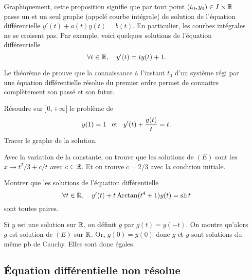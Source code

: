 \documentclass{magnolia}
\begin{document}
\begin{remarques}
\remarque Graphiquement, cette proposition signifie que par tout
  point $(t_0,y_0)\in I\times \mathbb{R}$ passe un et un seul graphe (appelé courbe
  intégrale) de solution de l'équation différentielle $y'(t)+a(t) y(t)=b(t)$. En
  particulier, les courbes intégrales ne se croisent pas. Par exemple, voici quelques
  solutions de l'équation différentielle
  \[\forall t\in\mathbb{R},\quad y'(t)=ty(t)+1.\]
\begin{center}
\end{center}
\remarque Le théorème de  prouve que la connaissance à l'instant $t_0$ d'un système régi par une équation différentielle résolue du premier ordre permet de connaitre complètement son passé et son futur.
\end{remarques}

\begin{exos}
\exo Résoudre sur $]0,+\infty[$ le problème de 
  \[y(1)=1 \quad\!\text{et}\quad\! y'(t)+\frac{y(t)}{t}=t.\]
Tracer le graphe de la solution.
\begin{sol}
Avec la variation de la constante, on trouve que les solutions de $(E)$ sont les $x\to t^2/3+c/t$ avec $c\in \mathbb{R}$. Et on trouve $c=2/3$ avec la condition initiale.
\end{sol}
\exo Montrer que les solutions de l'équation différentielle
  \[\forall t\in\mathbb{R} ,\quad y'(t)+t\operatorname{Arctan}(t^4+1)y(t)=\operatorname{sh} t\]
  sont toutes paires.
\end{exos}
\begin{sol}
Si $y$ est une solution sur $\mathbb{R}$, on définit $g$ par $g(t)=y(-t)$. On montre qu'alors $g$ est solution de $(E)$ sur $\mathbb{R}$. Or, $g(0)=y(0)$ donc $g$ et $y$ sont solutions du même pb de Cauchy. Elles sont donc égales.
\end{sol}

\subsection{Équation différentielle non résolue}
\end{document}
